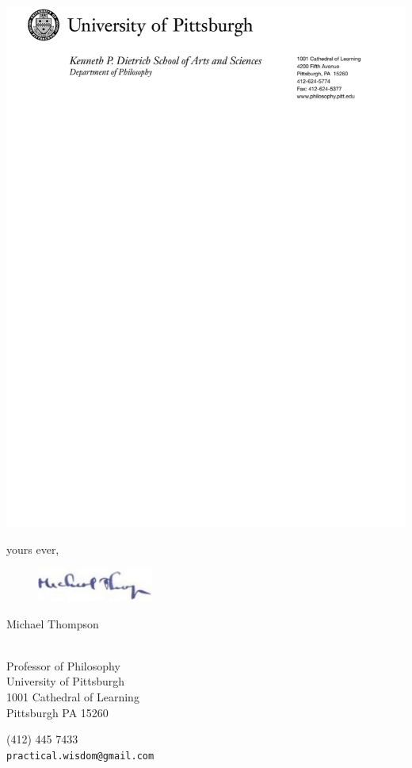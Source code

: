 \documentclass[leqno,13pt]{scrartcl}
\author{}
\begin{document}
\centerline{\includegraphics[width=7.5in]{images/hdr.png}}

\vspace*{-6.5 in}







yours ever,

\begin{figure}[htbp]
\includegraphics[width=1.5in]{images/sig.jpeg}
\end{figure}

Michael Thompson

~\\Professor of Philosophy\\University of Pittsburgh\\1001 Cathedral of
Learning\\Pittsburgh PA 15260

(412) 445 7433\\\texttt{practical.wisdom@gmail.com}
\end{document}
